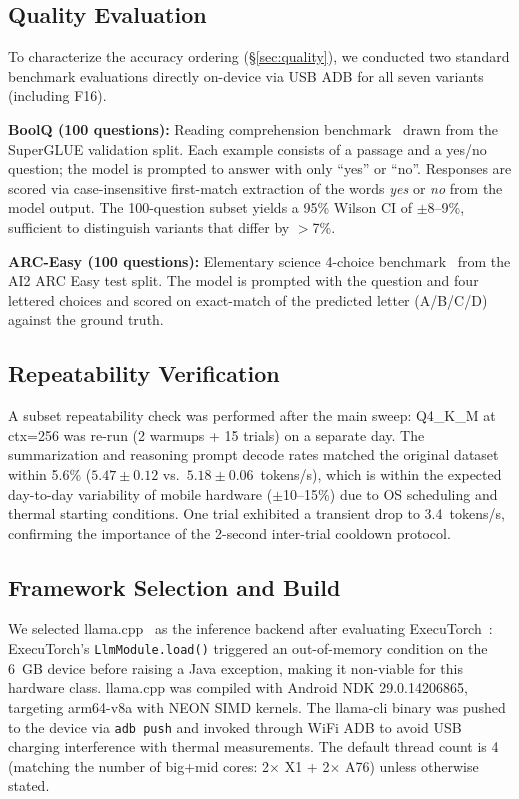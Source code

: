 \documentclass[conference]{IEEEtran}
\begin{document}
\subsection{Quality Evaluation}

To characterize the accuracy ordering (§\ref{sec:quality}), we conducted two
standard benchmark evaluations directly on-device via USB ADB for all seven variants
(including F16).

\textbf{BoolQ (100 questions):} Reading comprehension benchmark~\cite{boolq}
drawn from the SuperGLUE validation split. Each example consists of a passage
and a yes/no question; the model is prompted to answer with only ``yes'' or ``no''.
Responses are scored via case-insensitive first-match extraction of the words
\emph{yes} or \emph{no} from the model output. The 100-question subset yields
a 95\% Wilson CI of $\pm$8--9\%, sufficient to distinguish variants that differ
by $>$7\%.

\textbf{ARC-Easy (100 questions):} Elementary science 4-choice benchmark~\cite{arc}
from the AI2 ARC Easy test split. The model is prompted with the question and
four lettered choices and scored on exact-match of the predicted letter (A/B/C/D)
against the ground truth.

\subsection{Repeatability Verification}

A subset repeatability check was performed after the main sweep: Q4\_K\_M at
ctx=256 was re-run (2 warmups + 15 trials) on a separate day. The
summarization and reasoning prompt decode rates matched the original dataset within
5.6\% ($5.47 \pm 0.12$ vs.\ $5.18 \pm 0.06$~tokens/s), which is within the
expected day-to-day variability of mobile hardware ($\pm$10--15\%) due to
OS scheduling and thermal starting conditions. One trial exhibited a transient
drop to 3.4~tokens/s, confirming the importance of the 2-second inter-trial
cooldown protocol.

\subsection{Framework Selection and Build}

We selected llama.cpp~\cite{llamacpp} as the inference backend after evaluating
ExecuTorch~\cite{executorch}: ExecuTorch's \texttt{LlmModule.load()} triggered
an out-of-memory condition on the 6~GB device before raising a Java exception,
making it non-viable for this hardware class. llama.cpp was compiled with
Android NDK 29.0.14206865, targeting arm64-v8a with NEON SIMD kernels.
The llama-cli binary was pushed to the device via \texttt{adb push} and
invoked through WiFi ADB to avoid USB charging interference with thermal
measurements. The default thread count is 4 (matching the number of big+mid
cores: 2$\times$ X1 + 2$\times$ A76) unless otherwise stated.
\end{document}
